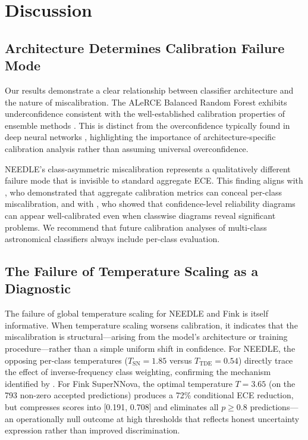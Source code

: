 \documentclass[twocolumn]{aastex631}
\begin{document}
\section{Discussion} \label{sec:discussion}

\subsection{Architecture Determines Calibration Failure Mode}

Our results demonstrate a clear relationship between classifier architecture and the nature of miscalibration. The ALeRCE Balanced Random Forest exhibits underconfidence consistent with the well-established calibration properties of ensemble methods \citep{niculescumizil2005, bostrom2008, loecher2024}. This is distinct from the overconfidence typically found in deep neural networks \citep{guo2017}, highlighting the importance of architecture-specific calibration analysis rather than assuming universal overconfidence.

NEEDLE's class-asymmetric miscalibration represents a qualitatively different failure mode that is invisible to standard aggregate ECE. This finding aligns with \citet{nixon2019}, who demonstrated that aggregate calibration metrics can conceal per-class miscalibration, and with \citet{kull2019}, who showed that confidence-level reliability diagrams can appear well-calibrated even when classwise diagrams reveal significant problems. We recommend that future calibration analyses of multi-class astronomical classifiers always include per-class evaluation.

\subsection{The Failure of Temperature Scaling as a Diagnostic}

The failure of global temperature scaling for NEEDLE and Fink is itself informative. When temperature scaling worsens calibration, it indicates that the miscalibration is structural---arising from the model's architecture or training procedure---rather than a simple uniform shift in confidence. For NEEDLE, the opposing per-class temperatures ($T_{\text{SN}} = 1.85$ versus $T_{\text{TDE}} = 0.54$) directly trace the effect of inverse-frequency class weighting, confirming the mechanism identified by \citet{vandengoorbergh2022}. For Fink SuperNNova, the optimal temperature $T = 3.65$ (on the 793 non-zero accepted predictions) produces a 72\% conditional ECE reduction, but compresses scores into [0.191, 0.708] and eliminates all $p \ge 0.8$ predictions---an operationally null outcome at high thresholds that reflects honest uncertainty expression rather than improved discrimination.
\end{document}
